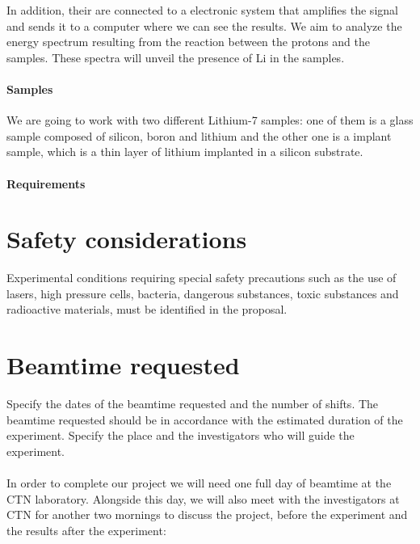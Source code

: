 \documentclass{article}
\begin{document}
\begin{multicols}{2}
In addition, their are connected to a electronic system that amplifies the signal and sends it to a computer where we can see the results.
We aim to analyze the energy spectrum resulting from the reaction between the protons and the samples.
These spectra will unveil the presence of Li in the samples.

\paragraph{Samples}

We are going to work with two different Lithium-7 samples: one of them is a glass sample composed of silicon, boron and lithium and the other one is a implant sample, which is a thin layer of lithium implanted in a silicon substrate.

\paragraph{Requirements}



\section{Safety considerations}

Experimental conditions requiring special safety precautions such as the use of lasers, high pressure cells, bacteria, dangerous substances, toxic substances and radioactive materials, must be identified in the proposal.

\section{Beamtime requested}

Specify the dates of the beamtime requested and the number of shifts. The beamtime requested should be in accordance with the estimated duration of the experiment. Specify the place and the investigators who will guide the experiment.

\paragraph*{}

In order to complete our project we will need one full day of beamtime at the CTN laboratory. Alongside this day, we will also meet with the investigators at CTN for another two mornings to discuss the project, before the experiment and the results after the experiment:


\end{multicols}
\end{document}

